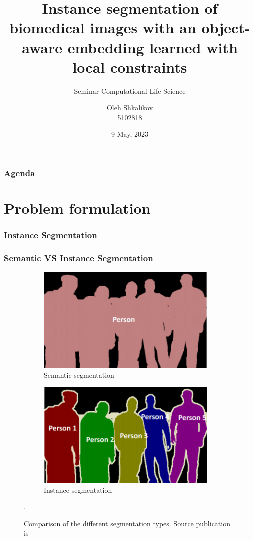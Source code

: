 \documentclass{beamer}
\title[Instance segmentation]{Instance segmentation of biomedical images with an object-aware
embedding learned with local constraints}
\subtitle{Seminar Computational Life Science}
\author[Oleh Shkalikov]{Oleh Shkalikov \texorpdfstring{\\ 5102818}{}}
\institute[TU Dresden]{TU Dresden, Computer Science Faculty}
\date{9 May, 2023}
\begin{document}
\frame{\titlepage}

\begin{frame}
    \frametitle{Agenda}
    \tableofcontents
\end{frame}

\section{Problem formulation}

\begin{frame}
    \frametitle{Instance Segmentation}

\end{frame}

\begin{frame}
    \frametitle{Semantic VS Instance Segmentation}

    \begin{figure}[h]
        \begin{subfigure}{0.5\textwidth}
            \centering
            \includegraphics[width=0.95\textwidth]{semantic_segm_example.png}
            \caption{Semantic segmentation}
        \end{subfigure}
        \begin{subfigure}{0.49\textwidth}
            \centering
            \includegraphics[width=0.95\textwidth]{instance_segm_example.png}
            \caption{Instance segmentation}
        \end{subfigure}
        \caption{Comparison of the different segmentation types. Source publication is \cite{segm_type_comp}}.
    \end{figure}

\end{frame}
\end{document}
